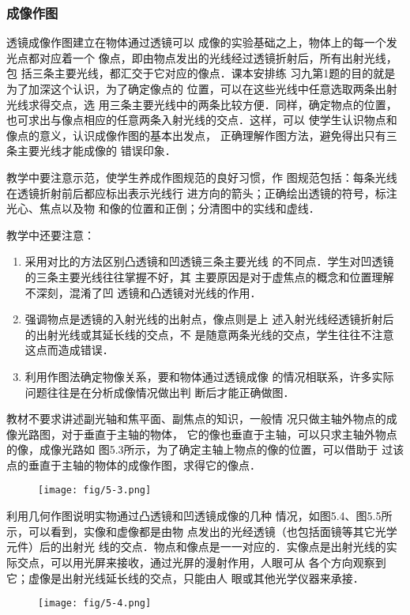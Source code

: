 \subsubsection{成像作图}

透镜成像作图建立在物体通过透镜可以
成像的实验基础之上，物体上的每一个发光点都对应着一个
像点，即由物点发出的光线经过透镜折射后，所有出射光线，包
括三条主要光线，都汇交于它对应的像点．课本安排练
习九第1题的目的就是为了加深这个认识，为了确定像点的
位置，可以在这些光线中任意选取两条出射光线求得交点，选
用三条主要光线中的两条比较方便．同样，确定物点的位置，
也可求出与像点相应的任意两条入射光线的交点．这样，可以
使学生认识物点和像点的意义，认识成像作图的基本出发点，
正确理解作图方法，避免得出只有三条主要光线才能成像的
错误印象．

教学中要注意示范，使学生养成作图规范的良好习惯，作
图规范包括：每条光线在透镜折射前后都应标出表示光线行
进方向的箭头；正确绘出透镜的符号，标注光心、焦点以及物
和像的位置和正倒；分清图中的实线和虚线．

教学中还要注意：
\begin{enumerate}
\item 采用对比的方法区别凸透镜和凹透镜三条主要光线
的不同点．学生对凹透镜的三条主要光线往往掌握不好，其
主要原因是对于虚焦点的概念和位置理解不深刻，混淆了凹
透镜和凸透镜对光线的作用．
\item 强调物点是透镜的入射光线的出射点，像点则是上
述入射光线经透镜折射后的出射光线或其延长线的交点，不
是随意两条光线的交点，学生往往不注意这点而造成错误．
\item 利用作图法确定物像关系，要和物体通过透镜成像
的情况相联系，许多实际问题往往是在分析成像情况做出判
断后才能正确做图．
\end{enumerate}

教材不要求讲述副光轴和焦平面、副焦点的知识，一般情
况只做主轴外物点的成像光路图，对于垂直于主轴的物体，
它的像也垂直于主轴，可以只求主轴外物点的像，成像光路如
图5.3所示，为了确定主轴上物点的像的位置，可以借助于
过该点的垂直于主轴的物体的成像作图，求得它的像点．
\begin{figure}[htp]
    \centering
    \texttt{[image: fig/5-3.png]}
    \caption{}
\end{figure}

利用几何作图说明实物通过凸透镜和凹透镜成像的几种
情况，如图5.4、图5.5所示，可以看到，实像和虚像都是由物
点发出的光经透镜（也包括面镜等其它光学元件）后的出射光
线的交点．物点和像点是一一对应的．实像点是出射光线的实
际交点，可以用光屏来接收，通过光屏的漫射作用，人眼可从
各个方向观察到它；虚像是出射光线延长线的交点，只能由人
眼或其他光学仪器来承接．
\begin{figure}[htp]
    \centering
    \texttt{[image: fig/5-4.png]}
    \caption{}
\end{figure}

